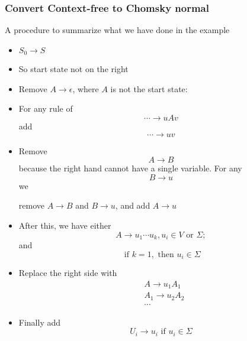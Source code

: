 \begin{frame}[allowframebreaks] \frametitle{Convert Context-free to Chomsky normal}

  A procedure to summarize what we have done in the example
  
  \begin{itemize}
\item $S_0 \rightarrow S$

\item [] So start state not on the right
\item Remove $A \rightarrow \epsilon$, where $A$ is not the start state:
\item[] For any rule of
  \begin{equation*}
\cdots  \rightarrow uAv 
\end{equation*}
 add
 \begin{equation*}
\cdots \rightarrow uv
\end{equation*}
\item Remove
  \begin{equation*}
  A \rightarrow B
\end{equation*}
because the right hand cannot have a single variable.
For any
\begin{equation*}
  B \rightarrow u
\end{equation*}
we
\begin{center}
remove $A \rightarrow B$ and   $B \rightarrow u$,
and add $A \rightarrow u$
\end{center}
\item After this, we have either
  \begin{equation*}
    A \rightarrow u_1 \cdots u_k, u_i \in V
      \mbox{ or } \Sigma;
\end{equation*}
and 
\begin{equation*}
\mbox{ if }
k = 1, \mbox{ then } u_i \in \Sigma
\end{equation*}
\item Replace the right side with
  \begin{equation*}
    \begin{split}
& A \rightarrow u_1A_1 \\
& A_1 \rightarrow u_2A_2 \\
& \cdots
\end{split}
\end{equation*}
\item Finally add
  \begin{equation*}
U_i \rightarrow u_i \text{ if } u_i \in \Sigma    
  \end{equation*}
\end{itemize}\end{frame}

